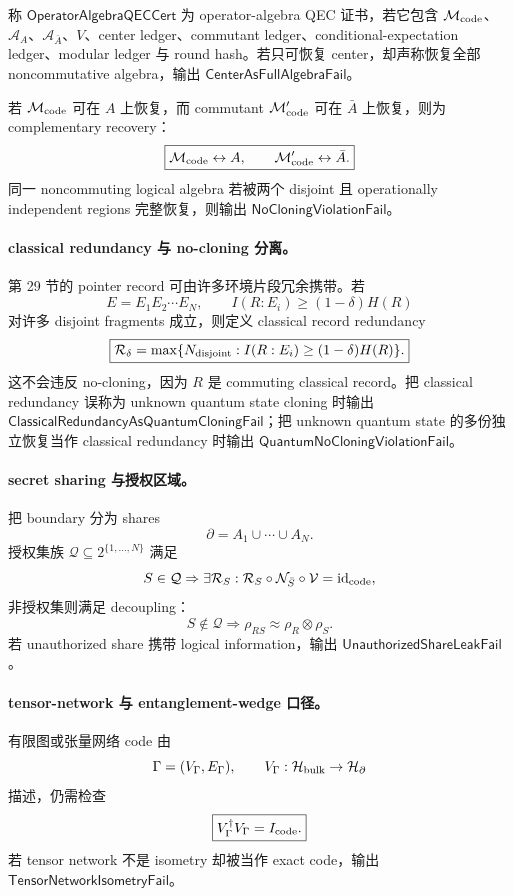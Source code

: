 \begin{definition}\label{def:typed-address-biaxial-completion-operator-algebra-qec-cert}
称 \(\mathsf{OperatorAlgebraQECCert}\) 为 operator-algebra QEC 证书，若它包含 \(\mathcal M_{\rm code}\)、\(\mathcal A_A\)、\(\mathcal A_{\bar A}\)、\(V\)、center ledger、commutant ledger、conditional-expectation ledger、modular ledger 与 round hash。若只可恢复 center，却声称恢复全部 noncommutative algebra，输出 \(\mathsf{CenterAsFullAlgebraFail}\)。
\end{definition}

若 \(\mathcal M_{\rm code}\) 可在 \(A\) 上恢复，而 commutant \(\mathcal M_{\rm code}'\) 可在 \(\bar A\) 上恢复，则为 complementary recovery：
\[
\boxed{
\mathcal M_{\rm code}\leftrightarrow A,
\qquad
\mathcal M_{\rm code}'\leftrightarrow\bar A.
}
\]
同一 noncommuting logical algebra 若被两个 disjoint 且 operationally independent regions 完整恢复，则输出 \(\mathsf{NoCloningViolationFail}\)。

\paragraph{classical redundancy 与 no-cloning 分离。}
第 29 节的 pointer record 可由许多环境片段冗余携带。若
\[
E=E_1E_2\cdots E_N,
\qquad
I(R:E_i)\ge(1-\delta)H(R)
\]
对许多 disjoint fragments 成立，则定义 classical record redundancy
\[
\boxed{
\mathcal R_\delta
=
\max\{N_{\rm disjoint}:I(R:E_i)\ge(1-\delta)H(R)\}.
}
\]
这不会违反 no-cloning，因为 \(R\) 是 commuting classical record。把 classical redundancy 误称为 unknown quantum state cloning 时输出 \(\mathsf{ClassicalRedundancyAsQuantumCloningFail}\)；把 unknown quantum state 的多份独立恢复当作 classical redundancy 时输出 \(\mathsf{QuantumNoCloningViolationFail}\)。

\paragraph{secret sharing 与授权区域。}
把 boundary 分为 shares
\[
\partial=A_1\cup\cdots\cup A_N.
\]
授权集族 \(\mathcal Q\subseteq2^{\{1,\ldots,N\}}\) 满足
\[
S\in\mathcal Q
\Rightarrow
\exists\mathcal R_S:
\mathcal R_S\circ\mathcal N_{\bar S}\circ\mathcal V
=
\operatorname{id}_{\rm code},
\]
非授权集则满足 decoupling：
\[
S\notin\mathcal Q
\Rightarrow
\rho_{RS}\approx\rho_R\otimes\rho_S.
\]
若 unauthorized share 携带 logical information，输出 \(\mathsf{UnauthorizedShareLeakFail}\)。

\paragraph{tensor-network 与 entanglement-wedge 口径。}
有限图或张量网络 code 由
\[
\Gamma=(V_\Gamma,E_\Gamma),
\qquad
V_\Gamma:\mathcal H_{\rm bulk}\to\mathcal H_\partial
\]
描述，仍需检查
\[
\boxed{
V_\Gamma^\dagger V_\Gamma=I_{\rm code}.
}
\]
若 tensor network 不是 isometry 却被当作 exact code，输出 \(\mathsf{TensorNetworkIsometryFail}\)。

